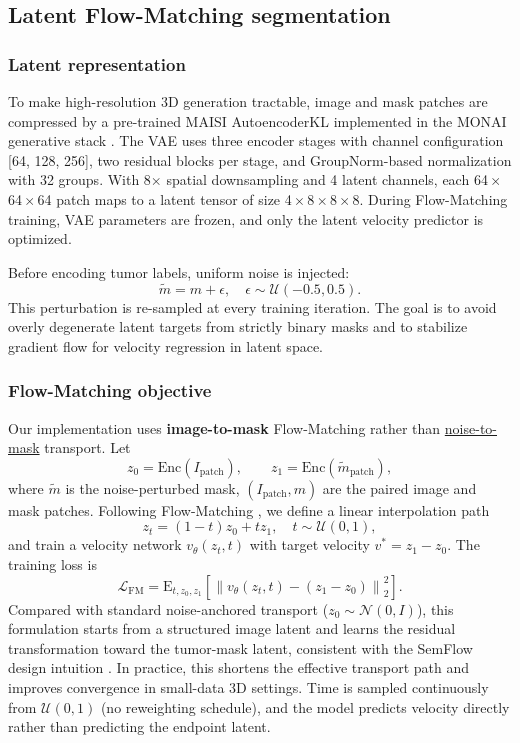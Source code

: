 \documentclass{iopjournal}
\begin{document}
\subsection{Latent Flow-Matching segmentation}
\subsubsection{Latent representation}
To make high-resolution 3D generation tractable, image and mask patches are compressed by a pre-trained MAISI AutoencoderKL \cite{he2024maisi} implemented in the MONAI generative stack \cite{cardoso2022monai}. The VAE uses three encoder stages with channel configuration [64, 128, 256], two residual blocks per stage, and GroupNorm-based normalization with 32 groups. With 8$\times$ spatial downsampling and 4 latent channels, each 64\,$\times$\,64\,$\times$\,64 patch maps to a latent tensor of size 4\,$\times$\,8\,$\times$\,8\,$\times$\,8. During Flow-Matching training, VAE parameters are frozen, and only the latent velocity predictor is optimized.

Before encoding tumor labels, uniform noise is injected:
\begin{equation}
\tilde{m} = m + \epsilon,\quad \epsilon\sim\mathcal{U}(-0.5,0.5).
\end{equation}
This perturbation is re-sampled at every training iteration. The goal is to avoid overly degenerate latent targets from strictly binary masks and to stabilize gradient flow for velocity regression in latent space.

\subsubsection{Flow-Matching objective}
Our implementation uses \textbf{image-to-mask} Flow-Matching rather than \underline{noise-to-mask} transport. Let
\begin{equation}
z_0 = \mathrm{Enc}(I_{\mathrm{patch}}), \qquad z_1 = \mathrm{Enc}(\tilde{m}_{\mathrm{patch}}),
\end{equation}
where $\tilde{m}$ is the noise-perturbed mask, $(I_{\mathrm{patch}}, m)$ are the paired image and mask patches. Following Flow-Matching \cite{lipman2023flow}, we define a linear interpolation path
\begin{equation}
z_t = (1-t)z_0 + tz_1,\quad t \sim \mathcal{U}(0,1),
\end{equation}
and train a velocity network $v_\theta(z_t,t)$ with target velocity $v^\ast = z_1 - z_0$. The training loss is
\begin{equation}
\mathcal{L}_{\mathrm{FM}} = \mathrm{E}_{t,z_0,z_1}\left[\left\|v_\theta(z_t,t)-\left(z_1-z_0\right)\right\|_2^2\right].
\end{equation}
Compared with standard noise-anchored transport ($z_0\sim\mathcal{N}(0,I)$), this formulation starts from a structured image latent and learns the residual transformation toward the tumor-mask latent, consistent with the SemFlow design intuition \cite{han2024semflow}. In practice, this shortens the effective transport path and improves convergence in small-data 3D settings. Time is sampled continuously from $\mathcal{U}(0,1)$ (no reweighting schedule), and the model predicts velocity directly rather than predicting the endpoint latent.
\end{document}
